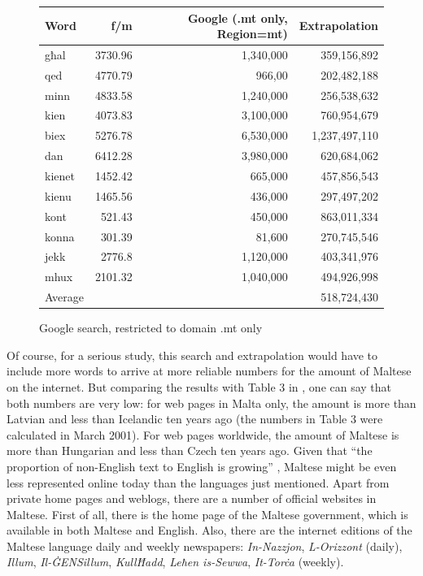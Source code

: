 \documentclass[]{../../metanetpaper}
\begin{document}
\begin{multicols}{2}
\begin{figure}[tb]
\setlength{\tabcolsep}{2.5em}
\begin{tabularx}{\textwidth}{lrrr} \toprule\addlinespace
Word & f/m & Google (.mt only, Region=mt) & Extrapolation \\
\hline
għal & 3730.96 & 1,340,000 & 359,156,892 \\
qed	& 4770.79 & 966,00  &  202,482,188  \\
minn & 4833.58 & 1,240,000  &  256,538,632 \\
kien & 4073.83 & 3,100,000  &  760,954,679 \\
biex & 5276.78 & 6,530,000  & 1,237,497,110 \\
dan	& 6412.28  & 3,980,000  & 620,684,062  \\
kienet & 1452.42  & 665,000 &  457,856,543 \\
kienu & 1465.56  & 436,000  & 297,497,202  \\
kont & 521.43  & 450,000  &  863,011,334 \\
konna & 301.39  & 81,600  &   270,745,546\\
jekk & 2776.8  &  1,120,000 & 403,341,976 \\
mhux & 2101.32  & 1,040,000  &  494,926,998 \\
\hline
Average& & & 518,724,430 \\
\hline
\end{tabularx}
\caption{Google search, restricted to domain .mt only}
\label{table:Google_B_en}
\end{figure}

Of course, for a serious study, this search and extrapolation would have to include more words to arrive at more reliable numbers for the amount of Maltese on the internet. But comparing the results with Table 3 in \cite{Kilgarriff-Grefenstette:2003}, one can say that both numbers are very low: for web pages in Malta only, the amount is more than Latvian and less than Icelandic ten years ago (the numbers in Table 3 were calculated in March 2001). For web pages worldwide, the amount of Maltese is more than Hungarian and less than Czech ten years ago. Given that ``the proportion of non-English text to English is growing'' \cite{Kilgarriff-Grefenstette:2003}, Maltese might be even less represented online today than the languages just mentioned.
Apart from private home pages and weblogs, there are a number of official websites in Maltese. First of all, there is the home page of the Maltese government\cite{GovernmentOfMalta1}, which is available in both Maltese and English. Also, there are the internet editions of the Maltese language daily and weekly newspapers: \emph{In-Nazzjon}, \emph{L-Orizzont} (daily), \emph{Illum}, \emph{Il-ĠENSillum}, \emph{KullĦadd}, \emph{Leħen is-Sewwa}, \emph{It-Torċa} (weekly).  


\end{multicols}
\end{document}
